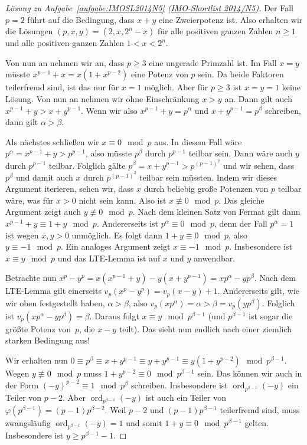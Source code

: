 \begin{proof}[Lösung zu Aufgabe~\ref{aufgabe:IMOSL2014N5} \textmd{(\href{https://artofproblemsolving.com/community/c107000_2014_imo_shortlist}{IMO-Shortlist 2014/N5})}]
	Der Fall $p=2$ führt auf die Bedingung, dass $x+y$ eine Zweierpotenz ist. Also erhalten wir die Lösungen $(p,x,y)=(2,x,2^n-x)$ für alle positiven ganzen Zahlen $n\geqslant 1$ und alle positiven ganzen Zahlen $1<x<2^n$.
	
	Von nun an nehmen wir an, dass $p\geqslant 3$ eine ungerade Primzahl ist. Im Fall $x=y$ müsste $x^{p-1}+x=x(1+x^{p-2})$ eine Potenz von $p$ sein. Da beide Faktoren teilerfremd sind, ist das nur für $x=1$ möglich. Aber für $p\geqslant 3$ ist $x=y=1$ keine Lösung. Von nun an nehmen wir ohne Einschränkung $x>y$ an. Dann gilt auch $x^{p-1}+y>x+y^{p-1}$. Wenn wir also $x^{p-1}+y=p^\alpha$ und $x+y^{p-1}=p^\beta$ schreiben, dann gilt $\alpha>\beta$.
	
	Als nächstes schließen wir $x\equiv 0\mod p$ aus. In diesem Fall wäre $p^\alpha =x^{p-1}+y>p^{p-1}$, also müsste $p^\beta$ durch $p^{p-1}$ teilbar sein. Dann wäre auch $y$ durch $p^{p-1}$ teilbar. Folglich gälte $p^\beta =x+y^{p-1}>p^{(p-1)^2}$ und wir sehen, dass $p^\beta$ und damit auch $x$ durch $p^{(p-1)^2}$ teilbar sein müssten. Indem wir dieses Argument iterieren, sehen wir, dass $x$ durch beliebig große Potenzen von $p$ teilbar wäre, was für $x>0$ nicht sein kann. Also ist $x\not\equiv 0\mod p$. Das gleiche Argument zeigt auch $y\not\equiv 0\mod p$. Nach dem kleinen Satz von Fermat gilt dann $x^{p-1}+y\equiv 1+y\mod p$. Andererseits ist $p^\alpha\equiv 0\mod p$, denn der Fall $p^\alpha=1$ ist wegen $x,y>0$ unmöglich. Es folgt dann $1+y\equiv 0\mod p$, also $y\equiv -1\mod p$. Ein analoges Argument zeigt $x\equiv -1\mod p$. Insbesondere ist $x\equiv y\mod p$ und das LTE-Lemma ist auf $x$ und $y$ anwendbar.
	
	Betrachte nun $x^p-y^p=x(x^{p-1}+y)-y(x+y^{p-1})=xp^\alpha-yp^\beta$. Nach dem LTE-Lemma gilt einerseits $v_p(x^p-y^p)=v_p(x-y)+1$. Andererseits gilt, wie wir oben festgestellt haben, $\alpha>\beta$, also $v_p(xp^\alpha)=\alpha >\beta=v_p(yp^\beta)$. Folglich ist $v_p(xp^\alpha-yp^\beta)=\beta$. Daraus folgt $x\equiv y\mod p^{\beta-1}$ (und $p^{\beta-1}$ ist sogar die größte Potenz von~$p$, die $x-y$ teilt). Das sieht nun endlich nach einer ziemlich starken Bedingung aus!
	
	Wir erhalten nun $0\equiv p^\beta\equiv x+y^{p-1}\equiv y+y^{p-1}\equiv y(1+y^{p-2})\mod p^{\beta-1}$. Wegen $y\not\equiv 0\mod p$ muss $1+y^{p-2}\equiv 0\mod p^{\beta-1}$ sein. Das können wir auch in der Form $(-y)^{p-2}\equiv 1\mod p^\beta$ schreiben. Insbesondere ist $\operatorname{ord}_{p^{\beta-1}}(-y)$ ein Teiler von $p-2$. Aber $\operatorname{ord}_{p^{\beta-1}}(-y)$ ist auch ein Teiler von $\varphi(p^{\beta-1})=(p-1)p^{\beta-2}$. Weil $p-2$ und $(p-1)p^{\beta-1}$ teilerfremd sind, muss zwangsläufig $\operatorname{ord}_{p^{\beta-1}}(-y)=1$ und somit $1+y\equiv 0\mod p^{\beta-1}$ gelten. Insbesondere ist $y\geqslant p^{\beta-1}-1$.
	

\end{proof}

